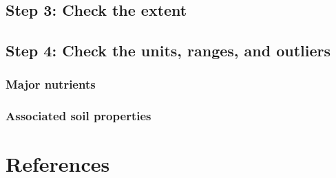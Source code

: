 \documentclass[
  10pt,
  b5paper,
  oneside]{book}
\begin{document}
\hypertarget{step-3-check-the-extent}{%
\section*{Step 3: Check the extent}\label{step-3-check-the-extent}}

\hypertarget{step-4-check-the-units-ranges-and-outliers}{%
\section*{Step 4: Check the units, ranges, and outliers}\label{step-4-check-the-units-ranges-and-outliers}}

\hypertarget{major-nutrients}{%
\subsection*{Major nutrients}\label{major-nutrients}}

\hypertarget{associated-soil-properties}{%
\subsection*{Associated soil properties}\label{associated-soil-properties}}

\hypertarget{references}{%
\chapter*{References}\label{references}}


\end{document}
